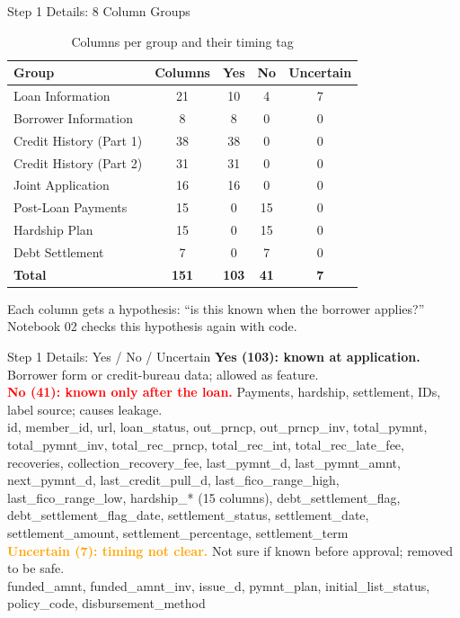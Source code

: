\documentclass{beamer}
\begin{document}
\begin{frame}{Step 1 Details: 8 Column Groups}
  \begin{table}
    \centering
    \scriptsize
    \caption{Columns per group and their timing tag}
    \begin{tabular}{lcccc}
      \hline
      \textbf{Group} & \textbf{Columns} & \textbf{Yes} & \textbf{No} & \textbf{Uncertain}\\
      \hline
      Loan Information & 21 & 10 & 4 & 7\\
      Borrower Information & 8 & 8 & 0 & 0\\
      Credit History (Part 1) & 38 & 38 & 0 & 0\\
      Credit History (Part 2) & 31 & 31 & 0 & 0\\
      Joint Application & 16 & 16 & 0 & 0\\
      Post-Loan Payments & 15 & 0 & 15 & 0\\
      Hardship Plan & 15 & 0 & 15 & 0\\
      Debt Settlement & 7 & 0 & 7 & 0\\
      \hline
      \textbf{Total} & \textbf{151} & \textbf{103} & \textbf{41} & \textbf{7}\\
      \hline
    \end{tabular}
  \end{table}
  Each column gets a hypothesis: ``is this known when the borrower applies?'' Notebook 02 checks this hypothesis again with code.
\end{frame}

\begin{frame}{Step 1 Details: Yes / No / Uncertain}
  \scriptsize
  \textbf{Yes (103): known at application.} Borrower form or credit-bureau data; allowed as feature.\\[0.1cm]
  \textcolor{red}{\textbf{No (41): known only after the loan.}} Payments, hardship, settlement, IDs, label source; causes leakage.\\
  {\tiny id, member\_id, url, loan\_status, out\_prncp, out\_prncp\_inv, total\_pymnt, total\_pymnt\_inv, total\_rec\_prncp, total\_rec\_int, total\_rec\_late\_fee, recoveries, collection\_recovery\_fee, last\_pymnt\_d, last\_pymnt\_amnt, next\_pymnt\_d, last\_credit\_pull\_d, last\_fico\_range\_high, last\_fico\_range\_low, hardship\_* (15 columns), debt\_settlement\_flag, debt\_settlement\_flag\_date, settlement\_status, settlement\_date, settlement\_amount, settlement\_percentage, settlement\_term}\\[0.15cm]
  \textcolor{orange}{\textbf{Uncertain (7): timing not clear.}} Not sure if known before approval; removed to be safe.\\
  {\tiny funded\_amnt, funded\_amnt\_inv, issue\_d, pymnt\_plan, initial\_list\_status, policy\_code, disbursement\_method}
\end{frame}
\end{document}
